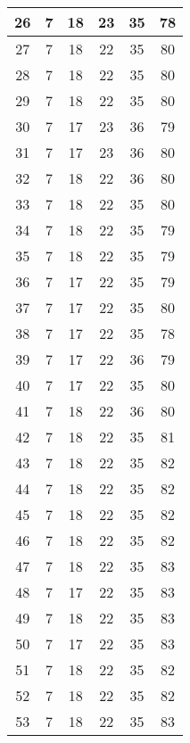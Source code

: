 \documentclass[10pt,journal,twocolumn]{IEEEtran}\IEEEoverridecommandlockouts
\begin{document}
{\begin{longtable}{|c|c|c|c|c|c|}
    26    & 7     & 18    & 23    & 35    & 78 \\\hline
    27    & 7     & 18    & 22    & 35    & 80 \\\hline
    28    & 7     & 18    & 22    & 35    & 80 \\\hline
    29    & 7     & 18    & 22    & 35    & 80 \\\hline
    30    & 7     & 17    & 23    & 36    & 79 \\\hline
    31    & 7     & 17    & 23    & 36    & 80 \\\hline
    32    & 7     & 18    & 22    & 36    & 80 \\\hline
    33    & 7     & 18    & 22    & 35    & 80 \\\hline
    34    & 7     & 18    & 22    & 35    & 79 \\\hline
    35    & 7     & 18    & 22    & 35    & 79 \\\hline
    36    & 7     & 17    & 22    & 35    & 79 \\\hline
    37    & 7     & 17    & 22    & 35    & 80 \\\hline
    38    & 7     & 17    & 22    & 35    & 78 \\\hline
    39    & 7     & 17    & 22    & 36    & 79 \\\hline
    40    & 7     & 17    & 22    & 35    & 80 \\\hline
    41    & 7     & 18    & 22    & 36    & 80 \\\hline
    42    & 7     & 18    & 22    & 35    & 81 \\\hline
    43    & 7     & 18    & 22    & 35    & 82 \\\hline
    44    & 7     & 18    & 22    & 35    & 82 \\\hline
    45    & 7     & 18    & 22    & 35    & 82 \\\hline
    46    & 7     & 18    & 22    & 35    & 82 \\\hline
    47    & 7     & 18    & 22    & 35    & 83 \\\hline
    48    & 7     & 17    & 22    & 35    & 83 \\\hline
    49    & 7     & 18    & 22    & 35    & 83 \\\hline
    50    & 7     & 17    & 22    & 35    & 83 \\\hline
    51    & 7     & 18    & 22    & 35    & 82 \\\hline
    52    & 7     & 18    & 22    & 35    & 82 \\\hline
    53    & 7     & 18    & 22    & 35    & 83 \\\hline

\end{longtable}}
\end{document}
